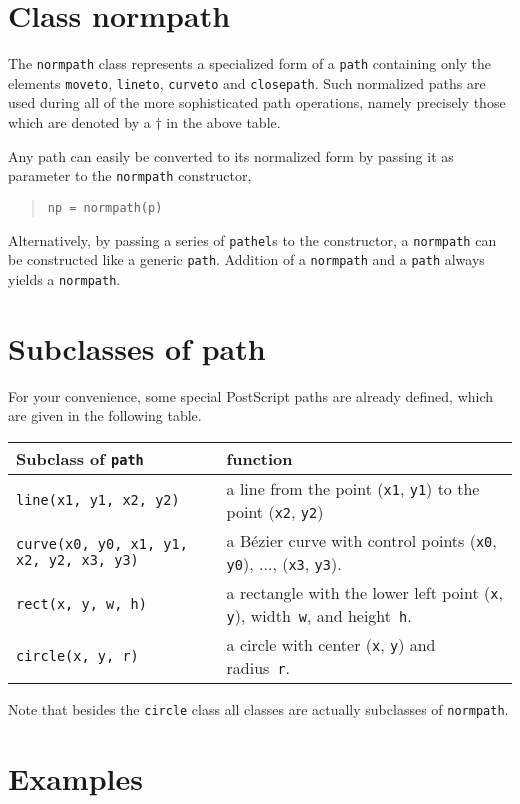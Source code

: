 \section{Class normpath}

The \texttt{normpath} class represents a specialized form of a
\texttt{path} containing only the elements \verb|moveto|,
\verb|lineto|, \verb|curveto| and \verb|closepath|. Such normalized
paths are used during all of the more sophisticated path operations,
namely precisely those which are denoted by a $\dagger$ in the above table.


Any path can
easily be converted to its normalized form by passing it as parameter
to the \texttt{normpath} constructor,
\begin{quote}
\begin{verbatim}
np = normpath(p)
\end{verbatim}
\end{quote}
Alternatively, by passing a series of \texttt{pathel}s to the constructor, a
\texttt{normpath} can be constructed like a generic \texttt{path}.
Addition of a \verb|normpath| and a \verb|path| always yields a
\verb|normpath|.

\section{Subclasses of path}

For your convenience, some special PostScript paths are already defined, which
are given in the following table.

\medskip
\begin{tabularx}{\linewidth}{l>{\raggedright\arraybackslash}X}
Subclass of \texttt{path} & function \\
\hline
\texttt{line(x1, y1, x2, y2)} & a line from the point
  (\texttt{x1}, \texttt{y1}) to the point (\texttt{x2}, \texttt{y2})\\
\texttt{curve(x0, y0, x1, y1, x2, y2, x3, y3)} & a B\'ezier curve with 
control points  (\texttt{x0}, \texttt{y0}), $\dots$, (\texttt{x3}, \texttt{y3}).\\
\texttt{rect(x, y, w, h)} &  a rectangle with the
  lower left point (\texttt{x}, \texttt{y}), width~\texttt{w}, and
  height~\texttt{h}. \\
\texttt{circle(x, y, r)} & a circle with 
  center (\texttt{x}, \texttt{y}) and radius~\texttt{r}.
\end{tabularx}
\medskip
Note that besides the \verb|circle| class all classes are actually
subclasses of \verb|normpath|.


\section{Examples}



